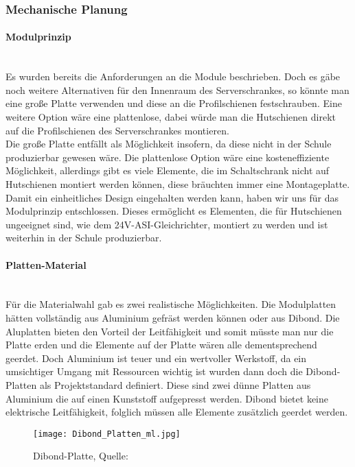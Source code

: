 \subsubsection{Mechanische Planung}

    \paragraph{Modulprinzip}\mbox{}\\
    Es wurden bereits die Anforderungen an die Module beschrieben. Doch es gäbe noch weitere Alternativen für den Innenraum des Serverschrankes, so könnte man eine große Platte verwenden und diese an die Profilschienen festschrauben. Eine weitere Option wäre eine plattenlose, dabei würde man die Hutschienen direkt auf die Profilschienen des Serverschrankes montieren.\\
    Die große Platte entfällt als Möglichkeit insofern, da diese nicht in der Schule produzierbar gewesen wäre. Die plattenlose Option wäre eine kosteneffiziente Möglichkeit, allerdings gibt es viele Elemente, die im Schaltschrank nicht auf Hutschienen montiert werden können, diese bräuchten immer eine Montageplatte.\\
    Damit ein einheitliches Design eingehalten werden kann, haben wir uns für das Modulprinzip entschlossen. Dieses ermöglicht es Elementen, die für Hutschienen ungeeignet sind, wie dem 24V-ASI-Gleichrichter, montiert zu werden und ist weiterhin in der Schule produzierbar.

    \paragraph{Platten-Material}\mbox{}\\
    Für die Materialwahl gab es zwei realistische Möglichkeiten. Die Modulplatten hätten vollständig aus Aluminium gefräst werden können oder aus Dibond. Die Aluplatten bieten den Vorteil der Leitfähigkeit und somit müsste man nur die Platte erden und die Elemente auf der Platte wären alle dementsprechend geerdet. Doch Aluminium ist teuer und ein wertvoller Werkstoff, da ein umsichtiger Umgang mit Ressourcen wichtig ist wurden dann doch die Dibond-Platten als Projektstandard definiert. Diese sind zwei dünne Platten aus Aluminium die auf einen Kunststoff aufgepresst werden. Dibond bietet keine elektrische Leitfähigkeit, folglich müssen alle Elemente zusätzlich geerdet werden. 

    \begin{figure}[H]
        \centering
        \texttt{[image: Dibond\_Platten\_ml.jpg]}
        \caption{Dibond-Platte, Quelle: \cite{Dibond-Platte}}
        \label{fig:Dibond}
    \end{figure}
        
